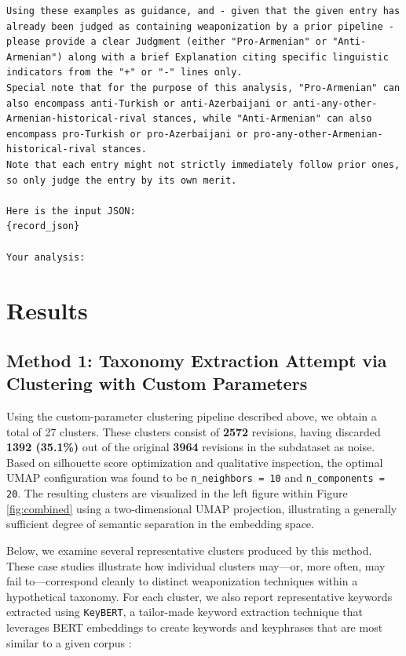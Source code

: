 \documentclass[11pt, a4paper, twoside, openright]{article} %
\begin{document}
\begin{lstlisting}[frame=single]
Using these examples as guidance, and - given that the given entry has already been judged as containing weaponization by a prior pipeline - please provide a clear Judgment (either "Pro-Armenian" or "Anti-Armenian") along with a brief Explanation citing specific linguistic indicators from the "+" or "-" lines only.
Special note that for the purpose of this analysis, "Pro-Armenian" can also encompass anti-Turkish or anti-Azerbaijani or anti-any-other-Armenian-historical-rival stances, while "Anti-Armenian" can also encompass pro-Turkish or pro-Azerbaijani or pro-any-other-Armenian-historical-rival stances.
Note that each entry might not strictly immediately follow prior ones, so only judge the entry by its own merit.

Here is the input JSON:
{record_json}

Your analysis:
\end{lstlisting}


\section{Results}

\subsection{Method 1: Taxonomy Extraction Attempt via Clustering with Custom Parameters}

Using the custom-parameter clustering pipeline described above, we obtain a total of 27 clusters. These clusters consist of \textbf{2572} revisions, having discarded \textbf{1392 (35.1\%)} out of the original \textbf{3964} revisions in the subdataset as noise. Based on silhouette score optimization and qualitative inspection, the optimal UMAP configuration was found to be \texttt{n\_neighbors = 10} and \texttt{n\_components = 20}. The resulting clusters are visualized in the left figure within Figure \ref{fig:combined} using a two-dimensional UMAP projection, illustrating a generally sufficient degree of semantic separation in the embedding space.

Below, we examine several representative clusters produced by this method. These case studies illustrate how individual clusters may—or, more often, may fail to—correspond cleanly to distinct weaponization techniques within a hypothetical taxonomy. For each cluster, we also report representative keywords extracted using \texttt{KeyBERT}, a tailor-made keyword extraction technique that leverages BERT embeddings to create keywords and keyphrases that are most similar to a given corpus \cite{grootendorst2020keybert}:
\end{document}

